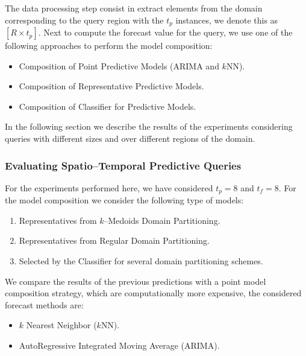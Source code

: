 The data processing step consist in extract elements from the domain corresponding to the query region with the $t_p$ instances, we denote this as $[R \times t_{p}]$. Next to compute the forecast value for the query, we use one of the following approaches to perform the model composition:

\begin{itemize}
	\item Composition of Point Predictive Models (ARIMA and $k$NN).
	\item Composition of Representative Predictive Models.
	\item Composition of Classifier for Predictive Models.	
\end{itemize}

In the following section we describe the results of the experiments considering queries with different sizes and over different regions of the domain.

\subsubsection{Evaluating Spatio--Temporal Predictive Queries}
\label{Sec:ExperimentsQueries}

For the experiments performed here, we have considered $t_{p} = 8$ and $t_{f} = 8$. For the model composition we consider the following type of models:

\begin{enumerate}
	\item Representatives from $k$--Medoids Domain Partitioning.
	\item Representatives from Regular Domain Partitioning.
	\item Selected by the Classifier for several domain partitioning schemes.
\end{enumerate}

We compare the results of the previous predictions with a point model composition strategy, which are computationally more expensive, the considered forecast methods are: 
\begin{itemize}
	\item $k$ Nearest Neighbor ($k$NN).
	\item AutoRegressive Integrated Moving Average (ARIMA).
\end{itemize}


